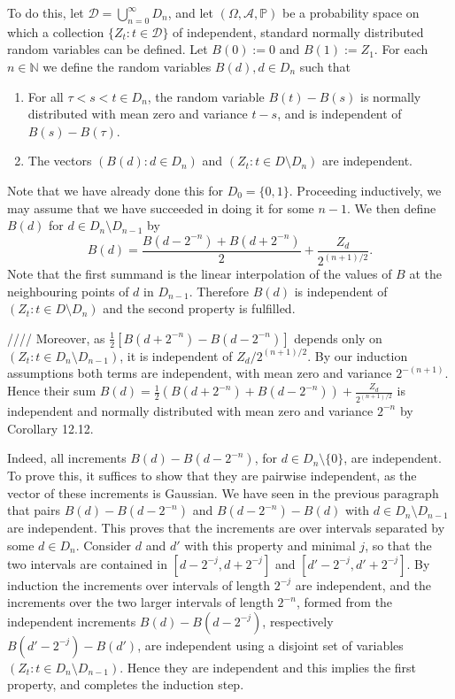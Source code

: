\documentclass{article}
\begin{document}
To do this, let $\mathcal{D} = \bigcup_{n=0}^\infty D_n$, and let $(\Omega, \mathcal{A}, \mathbb{P})$ be a probability space on which a collection $\{ Z_t : t \in \mathcal{D} \}$ of independent, standard normally distributed random variables can be defined. Let $B(0) := 0$ and $B(1) := Z_1$. For each $n \in \mathbb{N}$ we define the random variables $B(d), d \in D_n$ such that
\begin{enumerate}
    \item For all $\tau < s < t \in D_n$, the random variable $B(t) - B(s)$ is normally distributed with mean zero and variance $t - s$, and is independent of $B(s) - B(\tau)$.
    \item The vectors $\left( B(d) : d \in D_n \right)$ and $\left( Z_t : t \in D \setminus D_n \right)$ are independent.
\end{enumerate}

Note that we have already done this for $D_0 = \{0, 1\}$. Proceeding inductively, we may assume that we have succeeded in doing it for some $n - 1$. We then define $B(d)$ for $d \in D_n \setminus D_{n-1}$ by
\[
    B(d) = \frac{B(d - 2^{-n}) + B(d + 2^{-n})}{2} + \frac{Z_d}{2^{(n+1)/2}}.
\]
Note that the first summand is the linear interpolation of the values of $B$ at the neighbouring points of $d$ in $D_{n-1}$. Therefore $B(d)$ is independent of $\left( Z_t : t \in D \setminus D_n \right)$ and the second property is fulfilled.


////
Moreover, as $\frac{1}{2}\left[ B(d + 2^{-n}) - B(d - 2^{-n}) \right]$ depends only on $(Z_t : t \in D_n \setminus D_{n-1})$, it is independent of $Z_d / 2^{(n+1)/2}$. By our induction assumptions both terms are independent, with mean zero and variance $2^{-(n+1)}$. Hence their sum $B(d) = \frac{1}{2} \left( B(d + 2^{-n}) + B(d - 2^{-n}) \right) + \frac{Z_d}{2^{(n+1)/2}}$ is independent and normally distributed with mean zero and variance $2^{-n}$ by Corollary 12.12.

Indeed, all increments $B(d) - B(d - 2^{-n})$, for $d \in D_n \setminus \{ 0 \}$, are independent. To prove this, it suffices to show that they are pairwise independent, as the vector of these increments is Gaussian. We have seen in the previous paragraph that pairs $B(d) - B(d - 2^{-n})$ and $B(d - 2^{-n}) - B(d)$ with $d \in D_n \setminus D_{n-1}$ are independent. This proves that the increments are over intervals separated by some $d \in D_n$. Consider $d$ and $d'$ with this property and minimal $j$, so that the two intervals are contained in $[d - 2^{-j}, d + 2^{-j}]$ and $[d' - 2^{-j}, d' + 2^{-j}]$. By induction the increments over intervals of length $2^{-j}$ are independent, and the increments over the two larger intervals of length $2^{-n}$, formed from the independent increments $B(d) - B(d - 2^{-j})$, respectively $B(d' - 2^{-j}) - B(d')$, are independent using a disjoint set of variables $(Z_t : t \in D_n \setminus D_{n-1})$. Hence they are independent and this implies the first property, and completes the induction step.
\end{document}
